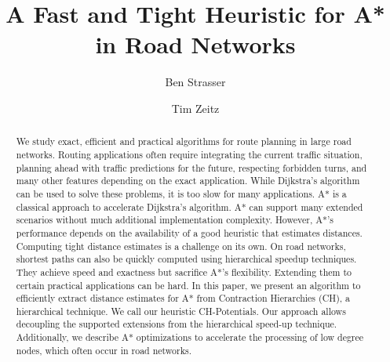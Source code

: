 \documentclass[manuscript,review]{acmart}
\begin{document}

\title{A Fast and Tight Heuristic for A* in Road Networks}

\author{Ben Strasser}
\affiliation{}

\author{Tim Zeitz}


\renewcommand{\shortauthors}{B. Strasser and T. Zeitz}


\begin{abstract}
We study exact, efficient and practical algorithms for route planning in large road networks.
Routing applications often require integrating the current traffic situation, planning ahead with traffic predictions for the future, respecting forbidden turns, and many other features depending on the exact application.
While Dijkstra's algorithm can be used to solve these problems, it is too slow for many applications.
A* is a classical approach to accelerate Dijkstra's algorithm.
A* can support many extended scenarios without much additional implementation complexity.
However, A*'s performance depends on the availability of a good heuristic that estimates distances.
Computing tight distance estimates is a challenge on its own.
On road networks, shortest paths can also be quickly computed using hierarchical speedup techniques.
They achieve speed and exactness but sacrifice A*'s flexibility.
Extending them to certain practical applications can be hard.
In this paper, we present an algorithm to efficiently extract distance estimates for A* from Contraction Hierarchies (CH), a hierarchical technique.
We call our heuristic CH-Potentials.
Our approach allows decoupling the supported extensions from the hierarchical speed-up technique.
Additionally, we describe A* optimizations to accelerate the processing of low degree nodes, which often occur in road networks.
\end{abstract}

\end{document}
